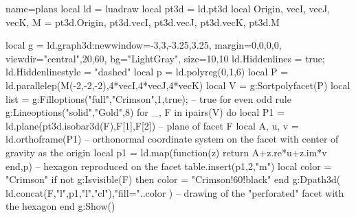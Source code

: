 \begin{luadraw}{name=plans}
local ld = luadraw
local pt3d = ld.pt3d
local Origin, vecI, vecJ, vecK, M = pt3d.Origin, pt3d.vecI, pt3d.vecJ, pt3d.vecK, pt3d.M

local g = ld.graph3d:new{window={-3,3,-3.25,3.25}, margin={0,0,0,0},
    viewdir={"central",20,60}, bg="LightGray", size={10,10}}
ld.Hiddenlines = true; ld.Hiddenlinestyle = "dashed"
local p = ld.polyreg(0,1,6)
local P = ld.parallelep(M(-2,-2,-2),4*vecI,4*vecJ,4*vecK)
local V = g:Sortpolyfacet(P)
local list = {}
g:Filloptions("full","Crimson",1,true); -- true for even odd rule
g:Lineoptions("solid","Gold",8)
for _, F in ipairs(V) do
    local P1 = ld.plane(pt3d.isobar3d(F),F[1],F[2]) -- plane of facet F
    local A, u, v = ld.orthoframe(P1) -- orthonormal coordinate system on the facet with center of gravity as the origin
    local p1 = ld.map(function(z) return A+z.re*u+z.im*v end,p) -- hexagon reproduced on the facet
    table.insert(p1,2,"m")
    local color = "Crimson"
    if not g:Isvisible(F) then color = "Crimson!60!black" end
    g:Dpath3d( ld.concat(F,{"l"},p1,{"l","cl"}),"fill="..color ) -- drawing of the "perforated" facet with the hexagon
end
g:Show()
\end{luadraw}
